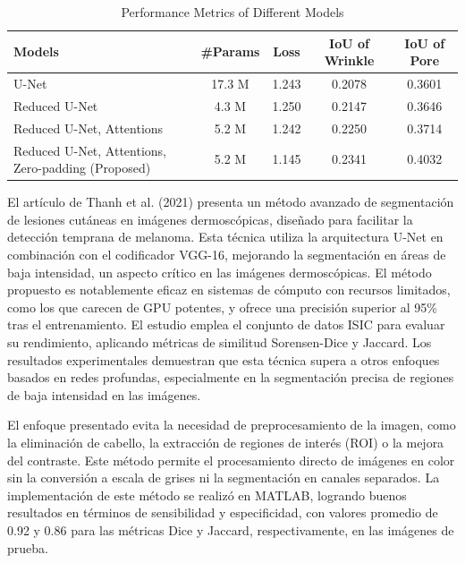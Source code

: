 \begin{table}[h!]
    \centering
    \caption{Performance Metrics of Different Models}
    \renewcommand{\arraystretch}{1.2} %
    \setlength{\tabcolsep}{5pt} %
    \begin{tabularx}{\textwidth}{@{}X c c c c@{}}
        \toprule
        \textbf{Models} & \textbf{\#Params} & \textbf{Loss} & \textbf{IoU of Wrinkle} & \textbf{IoU of Pore} \\ \midrule
        U-Net & 17.3 M & 1.243 & 0.2078 & 0.3601 \\
        Reduced U-Net & 4.3 M & 1.250 & 0.2147 & 0.3646 \\
        Reduced U-Net, Attentions & 5.2 M & 1.242 & 0.2250 & 0.3714 \\
        Reduced U-Net, Attentions, Zero-padding (Proposed) & 5.2 M & 1.145 & 0.2341 & 0.4032 \\ 
        \bottomrule
    \end{tabularx}
    \label{tab:models_performance}
\end{table}



El artículo de Thanh et al. (2021) \cite{Thanh2021} presenta un método avanzado de segmentación de lesiones cutáneas en imágenes dermoscópicas, diseñado para facilitar la detección temprana de melanoma. Esta técnica utiliza la arquitectura U-Net en combinación con el codificador VGG-16, mejorando la segmentación en áreas de baja intensidad, un aspecto crítico en las imágenes dermoscópicas. El método propuesto es notablemente eficaz en sistemas de cómputo con recursos limitados, como los que carecen de GPU potentes, y ofrece una precisión superior al 95\% tras el entrenamiento. El estudio emplea el conjunto de datos ISIC para evaluar su rendimiento, aplicando métricas de similitud Sorensen-Dice y Jaccard. Los resultados experimentales demuestran que esta técnica supera a otros enfoques basados en redes profundas, especialmente en la segmentación precisa de regiones de baja intensidad en las imágenes.

El enfoque presentado evita la necesidad de preprocesamiento de la imagen, como la eliminación de cabello, la extracción de regiones de interés (ROI) o la mejora del contraste. Este método permite el procesamiento directo de imágenes en color sin la conversión a escala de grises ni la segmentación en canales separados. La implementación de este método se realizó en MATLAB, logrando buenos resultados en términos de sensibilidad y especificidad, con valores promedio de 0.92 y 0.86 para las métricas Dice y Jaccard, respectivamente, en las imágenes de prueba.



